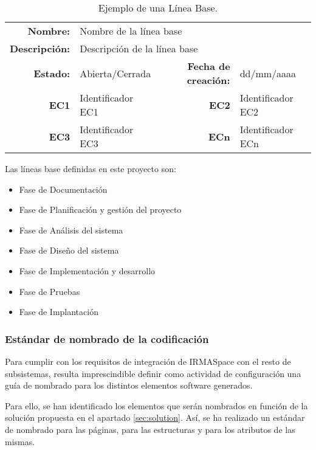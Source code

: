 \begin{table}[h]
\begin{center}
\begin{tabular}{ r l | r l }
\hline
\textbf{Nombre:} & \multicolumn{3}{l}{Nombre de la línea base} \\
\textbf{Descripción:} & \multicolumn{3}{l}{Descripción de la línea base} \\ \hline \hline
\textbf{Estado:} & Abierta/Cerrada & \textbf{Fecha de creación:} & dd/mm/aaaa \\
\textbf{EC1} & Identificador EC1 & \textbf{EC2} & Identificador EC2 \\
\textbf{EC3} & Identificador EC3 & \textbf{ECn} & Identificador ECn \\
\hline
\end{tabular}
\caption{Ejemplo de una Línea Base.}
\label{tab:baseLine}
\end{center}
\end{table}

\par Las líneas base definidas en este proyecto son:
\begin{itemize}[-]
  \item Fase de Documentación
  \item Fase de Planificación y gestión del proyecto
  \item Fase de Análisis del sistema
  \item Fase de Diseño del sistema
  \item Fase de Implementación y desarrollo
  \item Fase de Pruebas
  \item Fase de Implantación
\end{itemize}



\subsubsection{Estándar de nombrado de la codificación}
\par Para cumplir con los requisitos de integración de IRMASpace con el resto de subsistemas, resulta imprescindible definir como actividad de configuración una guía de nombrado para los distintos elementos software generados.
\par Para ello, se han identificado los elementos que serán nombrados en función de la solución propuesta en el apartado \ref{sec:solution}. Así, se ha realizado un estándar de nombrado para las páginas, para las estructuras y para los atributos de las mismas.

